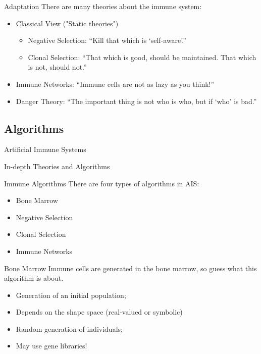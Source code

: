 \documentclass[xcolor=svgnames]{beamer}
\newcommand{\introframe}[2]{
    \begin{frame}
	   \vfill
	   \hfill\Huge{#1}
	   
	   \vspace{1em}
	   
	   \hfill\Large{#2}
	   \vfill
    \end{frame}
}
\begin{document}
		\begin{frame}{Adaptation}
		    There are many theories about the immune system:
		    
		    \begin{itemize}
		        \item Classical View ("Static theories")
		        \begin{itemize}
    		        \item Negative Selection: ``Kill that which is `self-aware'.''
    		        \item Clonal Selection: ``That which is good, should be maintained. That which is not, should not.''
    		    \end{itemize}
    		    \pause
		        \item Immune Networks: ``Immune cells are not as lazy as you think!''
		        \pause
		        \item Danger Theory: ``The important thing is not who is who, but if `who' is bad.''
		    \end{itemize}
		\end{frame}
		
	\subsection{Algorithms}
	
        \introframe{Artificial Immune Systems}{In-depth Theories and Algorithms}

        \begin{frame}{Immune Algorithms}
            There are four types of algorithms in AIS:

            \begin{itemize}
                \item Bone Marrow
                \item Negative Selection
                \item Clonal Selection
                \item Immune Networks
            \end{itemize}
        \end{frame}
        
        \begin{frame}{Bone Marrow}
            Immune cells are generated in the bone marrow, so guess what this algorithm is about.
            \begin{itemize}
                \item Generation of an initial population;
                \item Depends on the shape space (real-valued or symbolic)
                \item Random generation of individuals;
                \item May use gene libraries!
            \end{itemize}
        \end{frame}
        
\end{document}

